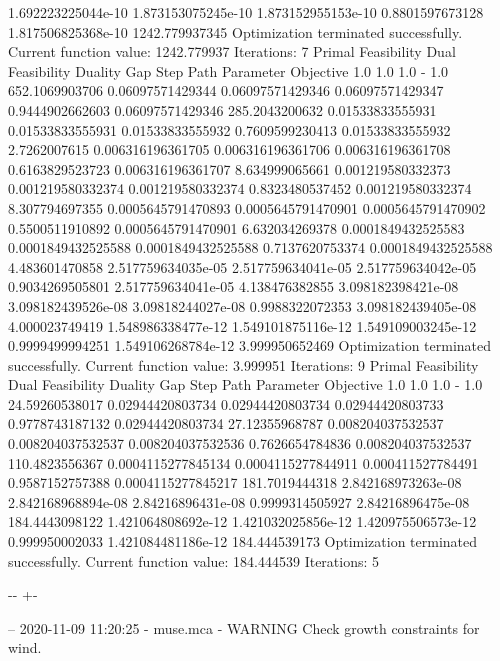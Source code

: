 \documentclass[letterpaper,10pt,english]{sphinxmanual}
\newlength\nbsphinxcodecellspacing
\begin{document}
{\begin{sphinxVerbatim}[commandchars=\\\{\}]
1.692223225044e-10  1.873153075245e-10  1.873152955153e-10  0.8801597673128  1.817506825368e-10  1242.779937345
Optimization terminated successfully.
         Current function value: 1242.779937
         Iterations: 7
Primal Feasibility  Dual Feasibility    Duality Gap         Step             Path Parameter      Objective
1.0                 1.0                 1.0                 -                1.0                 652.1069903706
0.06097571429344    0.06097571429346    0.06097571429347    0.9444902662603  0.06097571429346    285.2043200632
0.01533833555931    0.01533833555931    0.01533833555932    0.7609599230413  0.01533833555932    2.7262007615
0.006316196361705   0.006316196361706   0.006316196361708   0.6163829523723  0.006316196361707   8.634999065661
0.001219580332373   0.001219580332374   0.001219580332374   0.8323480537452  0.001219580332374   8.307794697355
0.0005645791470893  0.0005645791470901  0.0005645791470902  0.5500511910892  0.0005645791470901  6.632034269378
0.0001849432525583  0.0001849432525588  0.0001849432525588  0.7137620753374  0.0001849432525588  4.483601470858
2.517759634035e-05  2.517759634041e-05  2.517759634042e-05  0.9034269505801  2.517759634041e-05  4.138476382855
3.098182398421e-08  3.098182439526e-08  3.09818244027e-08   0.9988322072353  3.098182439405e-08  4.000023749419
1.548986338477e-12  1.549101875116e-12  1.549109003245e-12  0.9999499994251  1.549106268784e-12  3.999950652469
Optimization terminated successfully.
         Current function value: 3.999951
         Iterations: 9
Primal Feasibility  Dual Feasibility    Duality Gap         Step             Path Parameter      Objective
1.0                 1.0                 1.0                 -                1.0                 24.59260538017
0.02944420803734    0.02944420803734    0.02944420803733    0.9778743187132  0.02944420803734    27.12355968787
0.008204037532537   0.008204037532537   0.008204037532536   0.7626654784836  0.008204037532537   110.4823556367
0.0004115277845134  0.0004115277844911  0.000411527784491   0.9587152757388  0.0004115277845217  181.7019444318
2.842168973263e-08  2.842168968894e-08  2.84216896431e-08   0.9999314505927  2.84216896475e-08   184.4443098122
1.421064808692e-12  1.421032025856e-12  1.420975506573e-12  0.999950002033   1.421084481186e-12  184.444539173
Optimization terminated successfully.
         Current function value: 184.444539
         Iterations: 5
\end{sphinxVerbatim}
}

{

\kern-\sphinxverbatimsmallskipamount\kern-\baselineskip
\kern+\FrameHeightAdjust\kern-\fboxrule
\vspace{\nbsphinxcodecellspacing}

\begin{sphinxVerbatim}[commandchars=\\\{\}]
-- 2020-11-09 11:20:25 - muse.mca - WARNING
Check growth constraints for wind.

\end{sphinxVerbatim}
}
\end{document}
